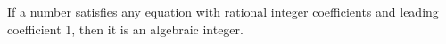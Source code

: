If a number satisfies any equation with rational integer coefficients and leading coefficient 1, then it is an algebraic integer.
